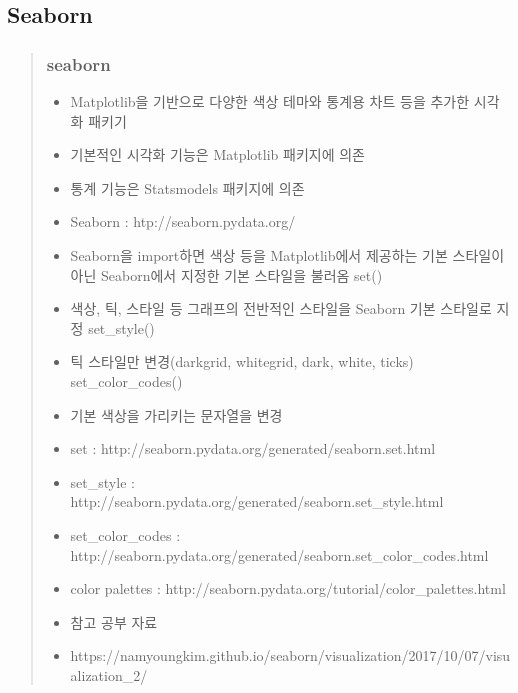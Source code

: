 \documentclass[11pt]{article}
\providecommand{\tightlist}{%
      \setlength{\itemsep}{0pt}\setlength{\parskip}{0pt}}
\begin{document}
    \hypertarget{seaborn}{%
\subsection{Seaborn}\label{seaborn}}

\begin{quote}
\hypertarget{seaborn-1}{%
\subsubsection{seaborn}\label{seaborn-1}}

\begin{itemize}
\tightlist
\item
  Matplotlib을 기반으로 다양한 색상 테마와 통계용 차트 등을 추가한
  시각화 패키기
\item
  기본적인 시각화 기능은 Matplotlib 패키지에 의존
\item
  통계 기능은 Statsmodels 패키지에 의존
\item
  Seaborn : htp://seaborn.pydata.org/
\item
  Seaborn을 import하면 색상 등을 Matplotlib에서 제공하는 기본 스타일이
  아닌 Seaborn에서 지정한 기본 스타일을 불러옴 set()
\item
  색상, 틱, 스타일 등 그래프의 전반적인 스타일을 Seaborn 기본 스타일로
  지정 set\_style()
\item
  틱 스타일만 변경(darkgrid, whitegrid, dark, white, ticks)
  set\_color\_codes()
\item
  기본 색상을 가리키는 문자열을 변경
\item
  set : http://seaborn.pydata.org/generated/seaborn.set.html
\item
  set\_style :
  http://seaborn.pydata.org/generated/seaborn.set\_style.html
\item
  set\_color\_codes :
  http://seaborn.pydata.org/generated/seaborn.set\_color\_codes.html
\item
  color palettes :
  http://seaborn.pydata.org/tutorial/color\_palettes.html
\item
  참고 공부 자료
\item
  https://namyoungkim.github.io/seaborn/visualization/2017/10/07/visualization\_2/
\end{itemize}
\end{quote}
\end{document}
